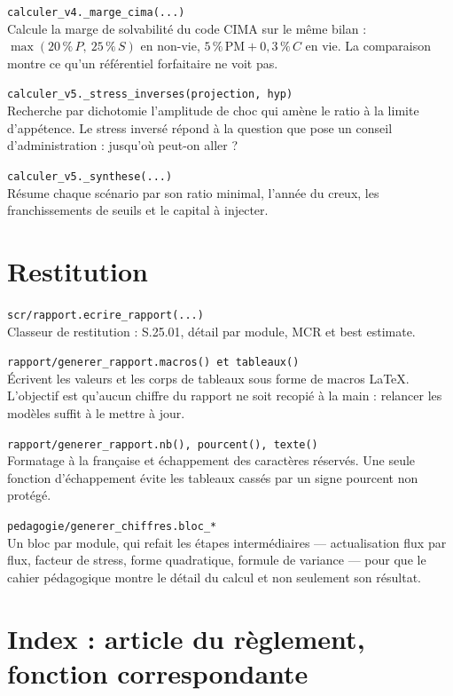 \documentclass[10pt,a4paper]{article}
\newcommand{\fn}[2]{\par\smallskip\textcolor{bleufonce}{\texttt{#1}}\\ #2\par}
\begin{document}
\fn{calculer\_v4.\_marge\_cima(...)}{Calcule la marge de solvabilité du code CIMA sur le même
bilan : $\max(20\,\%\,P,\ 25\,\%\,S)$ en non-vie, $5\,\%\,\mathrm{PM} + 0{,}3\,\%\,C$ en vie.
La comparaison montre ce qu'un référentiel forfaitaire ne voit pas.}

\fn{calculer\_v5.\_stress\_inverses(projection, hyp)}{Recherche par dichotomie l'amplitude de
choc qui amène le ratio à la limite d'appétence. Le stress inversé répond à la question que pose
un conseil d'administration : jusqu'où peut-on aller ?}

\fn{calculer\_v5.\_synthese(...)}{Résume chaque scénario par son ratio minimal, l'année du creux,
les franchissements de seuils et le capital à injecter.}

\section{Restitution}

\fn{scr/rapport.ecrire\_rapport(...)}{Classeur de restitution : S.25.01, détail par module, MCR
et best estimate.}

\fn{rapport/generer\_rapport.macros() et tableaux()}{Écrivent les valeurs et les corps de
tableaux sous forme de macros LaTeX. L'objectif est qu'aucun chiffre du rapport ne soit recopié à
la main : relancer les modèles suffit à le mettre à jour.}

\fn{rapport/generer\_rapport.nb(), pourcent(), texte()}{Formatage à la française et échappement
des caractères réservés. Une seule fonction d'échappement évite les tableaux cassés par un signe
pourcent non protégé.}

\fn{pedagogie/generer\_chiffres.bloc\_*}{Un bloc par module, qui refait les étapes intermédiaires
— actualisation flux par flux, facteur de stress, forme quadratique, formule de variance — pour
que le cahier pédagogique montre le détail du calcul et non seulement son résultat.}

\section{Index : article du règlement, fonction correspondante}
\end{document}
